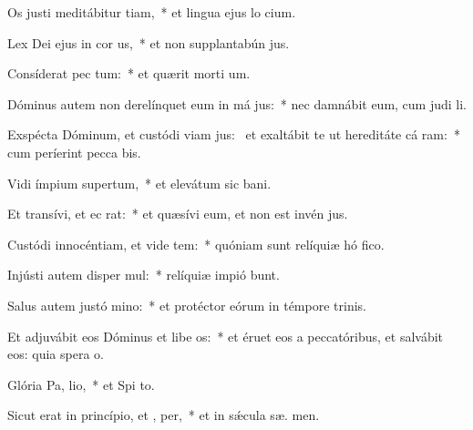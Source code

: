 \item Os justi meditábitur tiam,~* et lingua ejus lo cium.
\item Lex Dei ejus in cor us,~* et non supplantabún  jus.
\item Consíderat pec tum:~* et quærit morti um.
\item Dóminus autem non derelínquet eum in má jus:~* nec damnábit eum, cum judi li.
\item Exspécta Dóminum, et custódi viam jus:~\pscross{} et exaltábit te ut hereditáte cá ram:~* cum períerint pecca bis.
\item Vidi ímpium supertum,~* et elevátum sic  bani.
\item Et transívi, et ec  rat:~* et quæsívi eum, et non est invén  jus.
\item Custódi innocéntiam, et vide tem:~* quóniam sunt relíquiæ hó fico.
\item Injústi autem disper mul:~* relíquiæ impió bunt.
\item Salus autem justó  mino:~* et protéctor eórum in témpore trinis.
\item Et adjuvábit eos Dóminus et libe os:~* et éruet eos a peccatóribus, et salvábit eos: quia spera  o.
\item Glória Pa,  lio,~* et Spi to.
\item Sicut erat in princípio, et ,  per,~* et in sǽcula sæ. men.
